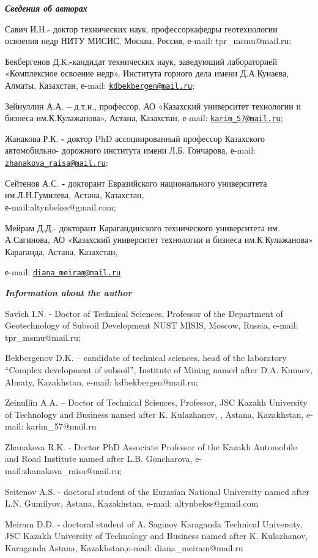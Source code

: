 \begin{authorinfo}
\hspace{1em}\emph{{\bfseries Сведения об авторах}}

Савич И.Н.- доктор технических наук, профессоркафедры геотехнологии
освоения недр НИТУ МИСИС, Москва, Россия, е-mail: tpr\_msmu@mail.ru;

Бекбергенов Д.К.{\bfseries -}кандидат технических наук, заведующий
лабораторией «Комплексное освоение недр», Института горного дела имени
Д.А.Кунаева, Алматы, Казахстан, е-mail:
\href{mailto:kdbekbergen@mail.ru}{\nolinkurl{kdbekbergen@mail.ru}};

Зейнуллин А.А. {\bfseries --} д.т.н., профессор, АО «Казахский университет
технологии и бизнеса им.К.Кулажанова», Астана, Казахстан, е-mail:
\href{mailto:karim_57@mail.ru}{\nolinkurl{karim\_57@mail.ru}};

Жанакова Р.К. {\bfseries -} доктор PhD ассоциированный профессор Казахского
автомобильно- дорожного института имени Л.Б. Гончарова, е-mail:
\href{mailto:zhanakova_raisa@mail.ru}{\nolinkurl{zhanakova\_raisa@mail.ru}};

Сейтенов А.С. {\bfseries -} докторант Евразийского национального
университета им.Л.Н.Гумилева, Астана, Казахстан, \\е-mail:altynbekss@gmail.com;

Мейрам Д.Д.- докторант Карагандинского технического университета им.
А.Сагинова, АО «Казахский университет технологии и бизнеса
им.К.Кулажанова» Караганда, Астана, Казахстан,

е-mail:
\href{mailto:diana_meiram@mail.ru}{\nolinkurl{diana\_meiram@mail.ru}}

\hspace{1em}\emph{{\bfseries Information about the author}}

Savich I.N. - Doctor of Technical Sciences, Professor of the Department
of Geotechnology of Subsoil Development NUST MISIS, Moscow, Russia,
e-mail: tpr\_msmu@mail.ru;

Bekbergenov D.K. -- candidate of technical sciences, head of the
laboratory ``Complex development of subsoil'', Institute of Mining named
after D.A. Kunaev, Almaty, Kazakhstan, e-mail: kdbekbergen@mail.ru;

Zeinullin A.A. -- Doctor of Technical Sciences, Professor, JSC Kazakh
University of Technology and Business named after K. Kulazhanov, ,
Astana, Kazakhstan, e-mail: karim\_57@mail.ru

Zhanakova R.K. - Doctor PhD Associate Professor of the Kazakh Automobile
and Road Institute named after L.B. Goncharova, e-mail:zhanakova\_raisa@mail.ru;

Seitenov A.S. - doctoral student of the Eurasian National University
named after L.N. Gumilyov, Astana, Kazakhstan, e-mail: altynbekss@gmail.com

Meiram D.D. - doctoral student of A. Saginov Karaganda Technical
University, JSC Kazakh University of Technology and Business named after
K. Kulazhanov, Karaganda Astana, Kazakhstan,e-mail:
diana\_meiram@mail.ru
\end{authorinfo}
